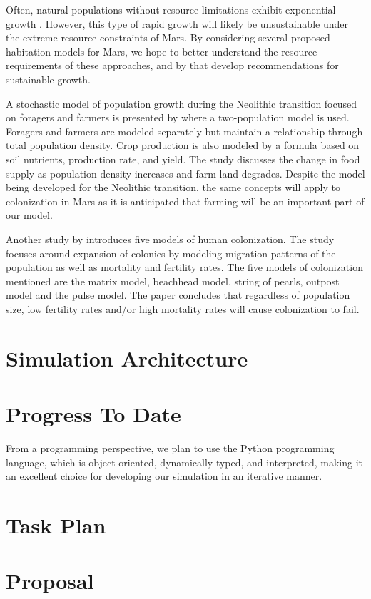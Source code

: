 \documentclass[12pt]{article}
\begin{document}
Often, natural populations without resource limitations exhibit exponential
growth \cite{audesirk1996biology}. However, this type of rapid growth will
likely be unsustainable under the extreme resource constraints of Mars.
By considering several proposed habitation models for Mars, we hope to better
understand the resource requirements of these approaches, and by that develop
recommendations for sustainable growth.

A stochastic model of population growth	during the Neolithic transition focused
on foragers and farmers is presented by \cite{fedotov2008stochastic} where a
two-population model is used. Foragers and farmers are modeled separately but
maintain a relationship through total population density. Crop production is
also modeled by a formula based on soil nutrients, production rate, and yield.
The study discusses the change in food supply as population density increases
and farm land degrades. Despite the model being developed for the Neolithic
transition, the same concepts will apply to colonization in Mars as it is
anticipated that farming will be an important part of our model.

Another study by \cite{moore2001evaluating} introduces five models of human
colonization.  The study focuses around expansion of colonies by modeling
migration patterns of the population as well as mortality and fertility rates.
The five models of colonization mentioned are the matrix model, beachhead
model, string of pearls, outpost model and the pulse model. The paper
concludes that regardless of population size, low fertility rates and/or high
mortality rates will cause colonization to fail.

\section{Simulation Architecture}
\label{sec:architecture}

\section{Progress To Date}
\label{sec:progress}

From a programming perspective, we plan to use the Python programming language,
which is object-oriented, dynamically typed, and interpreted, making it an
excellent choice for developing our simulation in an iterative manner.

\section{Task Plan}
\label{sec:taskplan}

\section{Proposal}
\label{sec:proposal}

\clearpage
{}

\end{document}
